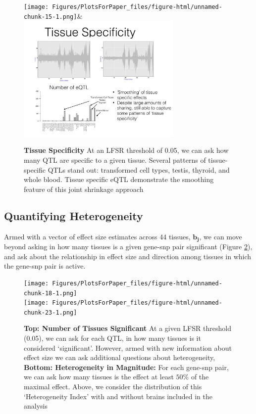 \newline
\begin{figure}[htbp]
\begin{center}
\texttt{[image: Figures/PlotsForPaper\_files/figure-html/unnamed-chunk-15-1.png]}&
\includegraphics[width=8cm]{Figures/tspecsmooth.pdf}
\end{center}
\caption{\textbf{Tissue Specificity} At an LFSR threshold of 0.05, we can ask how many QTL are specific to a given tissue. Several patterns of tissue-specific QTLs stand out: transformed cell types, testis, thyroid, and whole blood. Tissue specific eQTL demonstrate the smoothing feature of this joint shrinkage approach}
\label{fig:tspec}
\end{figure}\newline




\subsection{Quantifying Heterogeneity}


Armed with a vector of effect size estimates across 44 tissues, $\bm{b_{j}}$, we can move beyond asking in how many tissues is a given gene-snp pair significant (Figure \ref{fig:het}), and ask about the relationship in effect size and direction among tissues in which the gene-snp pair is active.


\newline
\begin{figure}[htbp]
\texttt{[image: Figures/PlotsForPaper\_files/figure-html/unnamed-chunk-18-1.png]}\\
\texttt{[image: Figures/PlotsForPaper\_files/figure-html/unnamed-chunk-23-1.png]}\\
\caption{\textbf{Top: Number of Tissues Significant} At a given LFSR threshold (0.05), we can ask for each QTL, in how many tissues is it considered `significant'. However, armed with new information about effect size we can ask additional questions about heterogeneity, \textbf{Bottom: Heterogeneity in Magnitude:} For each gene-snp pair, we can ask how many tissues is the effect at least $50\%$ of the maximal effect. Above, we consider the distribution of this `Heterogeneity Index' with and without brains included in the analysis}
\label{fig:het}
\end{figure}\newline



